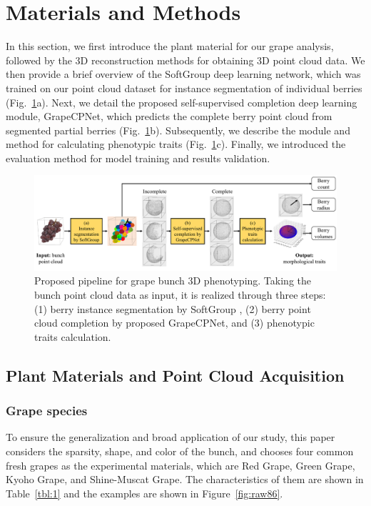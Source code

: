 \documentclass[12pt]{article}
\begin{document}
\section{Materials and Methods}

In this section, we first introduce the plant material for our grape analysis, followed by the 3D reconstruction methods for obtaining 3D point cloud data. 
We then provide a brief overview of the SoftGroup \citep{vu_softgroup_2022} deep learning network, which was trained on our point cloud dataset for instance segmentation of individual berries (Fig.~\ref{fig:raw1}a). 
Next, we detail the proposed self-supervised completion deep learning module, GrapeCPNet, which predicts the complete berry point cloud from segmented partial berries (Fig.~\ref{fig:raw1}b). 
Subsequently, we describe the module and method for calculating phenotypic traits (Fig.~\ref{fig:raw1}c). 
Finally, we introduced the evaluation method for model training and results validation.

\begin{figure}[hbt!]
    \centering
    \includegraphics[width=1\textwidth]{figures/Figure1.pdf}
    \caption{Proposed pipeline for grape bunch 3D phenotyping. Taking the bunch point cloud data as input, it is realized through three steps: (1) berry instance segmentation by SoftGroup \citep{vu_softgroup_2022}, (2) berry point cloud completion by proposed GrapeCPNet, and (3) phenotypic traits calculation.}
    \label{fig:raw1}
\end{figure}

\subsection{Plant Materials and Point Cloud Acquisition}

\subsubsection{Grape species}

To ensure the generalization and broad application of our study, this paper considers the sparsity, shape, and color of the bunch, and chooses four common fresh grapes as the experimental materials, which are Red Grape, Green Grape, Kyoho Grape, and Shine-Muscat Grape. 
The characteristics of them are shown in Table~\ref{tbl:1} and the examples are shown in Figure~\ref{fig:raw86}.
\end{document}

